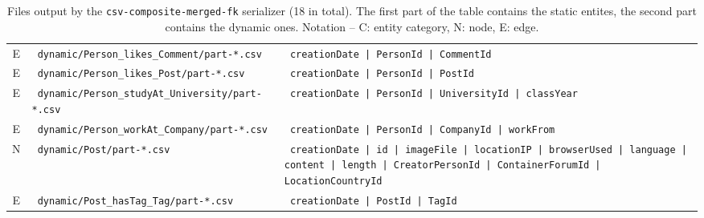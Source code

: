 \begin{table}[htb]
\begin{tabularx}{\linewidth}{|>{\sffamily}c|>{\tt}l|>{\tt}X|}
        E                    & dynamic/Person\_likes\_Comment/part-*.csv        & creationDate | PersonId | CommentId \\
        E                    & dynamic/Person\_likes\_Post/part-*.csv           & creationDate | PersonId | PostId \\
        E                    & dynamic/Person\_studyAt\_University/part-*.csv   & creationDate | PersonId | UniversityId | classYear \\
        E                    & dynamic/Person\_workAt\_Company/part-*.csv       & creationDate | PersonId | CompanyId | workFrom \\
        \hline
        N                    & dynamic/Post/part-*.csv                          & creationDate | id | imageFile | locationIP | browserUsed | language | content | length | CreatorPersonId | ContainerForumId | LocationCountryId \\
        E                    & dynamic/Post\_hasTag\_Tag/part-*.csv             & creationDate | PostId | TagId \\
        \hline
    \end{tabularx}
    \caption{Files output by the \texttt{csv-composite-merged-fk} serializer (18 in total). The first part of the table contains the static entites, the second part contains the dynamic ones.
        Notation -- \textsf{C}: entity category, \textsf{N}: node, \textsf{E}: edge.}
    \label{table:csv-composite-merged-fk}
\end{table}
